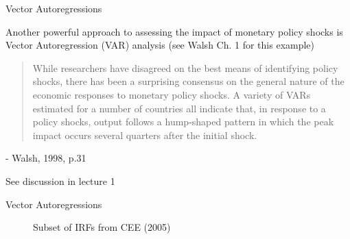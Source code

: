 \begin{frame}{Vector Autoregressions}

Another powerful approach to assessing the impact of monetary policy shocks is Vector Autoregression (VAR) analysis (see Walsh Ch. 1 for this example)

\vspace{3mm}
\begin{quotation}
While researchers have disagreed on the best means of identifying policy shocks, there has been a surprising consensus on the general nature of the economic responses to monetary policy shocks. A variety of VARs estimated for a number of countries all indicate that, in response to a policy shocks, output follows a hump-shaped pattern in which the peak impact occurs several quarters after the initial shock.
\end{quotation}
\begin{center}
- Walsh, 1998, p.31
\end{center}

\vspace{3mm}
See discussion in lecture 1

\end{frame}



\begin{frame}{Vector Autoregressions}

\begin{figure}[!htb]
\caption{\label{fig:cee05_2} Subset of IRFs from CEE (2005)}
\end{figure}

\end{frame}

